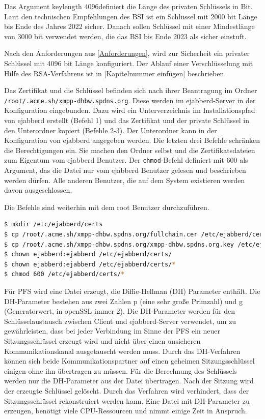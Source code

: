 \documentclass[a4paper,titlepage,halfparskip,12pt]{scrreprt}
\begin{document}
\begin{onehalfspacing}
Das Argument \glqq keylength 4096\grqq definiert die Länge des privaten Schlüssels in Bit. Laut den technischen Empfehlungen des \ac{BSI} ist ein Schlüssel mit 2000 bit Länge bis Ende des Jahres 2022 sicher. Danach sollen Schlüssel mit einer Mindestlänge von 3000 bit verwendet werden, die das \ac{BSI} bis Ende 2023 als sicher einstuft.\cite{empfehlungBSI}

Nach den Anforderungen aus \autoref{Anforderungen}, wird zur Sicherheit ein privater Schlüssel mit 4096 bit Länge konfiguriert. Der Ablauf einer Verschlüsselung mit Hilfe des \ac{RSA}-Verfahrens ist in [Kapitelnummer einfügen] beschrieben.

Das Zertifikat und die Schlüssel befinden sich nach ihrer Beantragung im Ordner \texttt{/root/.acme.sh/xmpp-dhbw.spdns.org}. Diese werden im ejabberd-Server in der Konfiguration eingebunden. Dazu wird ein Unterverzeichnis im Installationspfad von ejabberd erstellt (Befehl 1) und das Zertifikat und der private Schlüssel in den Unterordner kopiert (Befehle 2-3). Der Unterordner kann in der Konfiguration von ejabberd angegeben werden.
Die letzten drei Befehle schränken die Berechtigungen ein. Sie machen den Ordner selbst und die Zertifikatsdateien zum Eigentum vom ejabberd Benutzer. Der \texttt{chmod}-Befehl definiert mit 600 als Argument, das die Datei nur vom ejabberd Benutzer gelesen und beschrieben werden dürfen. Alle anderen Benutzer, die auf dem System existieren werden davon ausgeschlossen.

Die Befehle sind weiterhin mit dem root Benutzer durchzuführen.

\bigskip

\begin{lstlisting}[language=bash, caption={Kopieren der Zertifikate in ein Unterverzeichnis und Einschränkung der Rechte},label={lst:ejabberdCerts}]
$ mkdir /etc/ejabberd/certs
$ cp /root/.acme.sh/xmpp-dhbw.spdns.org/fullchain.cer /etc/ejabberd/certs/fullchain.pem
$ cp /root/.acme.sh/xmpp-dhbw.spdns.org/xmpp-dhbw.spdns.org.key /etc/ejabberd/certs/
$ chown ejabberd:ejabberd /etc/ejabberd/certs/
$ chown ejabberd:ejabberd /etc/ejabberd/certs/*
$ chmod 600 /etc/ejabberd/certs/*
\end{lstlisting}

Für \ac{PFS} wird eine Datei erzeugt, die Diffie-Hellman (DH) Parameter enthält. Die DH-Parameter bestehen aus zwei Zahlen p (eine sehr große Primzahl) und g (Generatorwert, in openSSL immer 2). Die DH-Parameter werden für den Schlüsselaustausch zwischen Client und ejabberd-Server verwendet, um zu gewährleisten, dass bei jeder Verbindung im Sinne der \ac{PFS} ein neuer Sitzungsschlüssel erzeugt wird und nicht über einen unsicheren Kommunikationskanal ausgetauscht werden muss. Durch das DH-Verfahren können sich beide Kommunikationspartner auf einen geheimen Sitzungsschlüssel einigen ohne ihn übertragen zu müssen. Für die Berechnung des Schlüssels werden nur die DH-Parameter aus der Datei übertragen. Nach der Sitzung wird der erzeugte Schlüssel gelöscht. Durch das Verfahren wird verhindert, dass der Sitzungsschlüssel rekonstruiert werden kann. Eine Datei mit DH-Parameter zu erzeugen, benötigt viele CPU-Ressourcen und nimmt einige Zeit in Anspruch.\cite{perfectForwardSecrecy}


\end{onehalfspacing}
\end{document}
